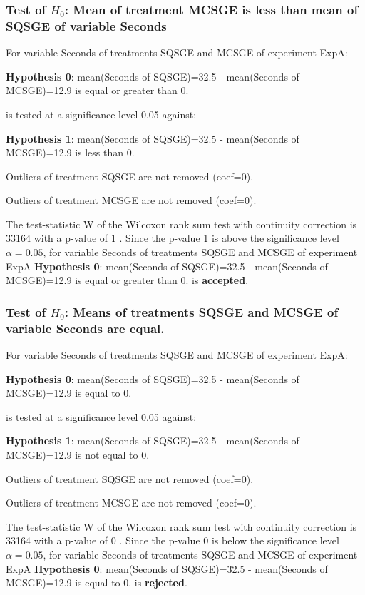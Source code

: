 \documentclass[18pt,c]{beamer}
\begin{document}
\begin{frame}[t]
 \frametitle{Test of $H_{0}$: Mean of treatment MCSGE is less than mean of SQSGE of variable Seconds }
 \scriptsize
 For variable Seconds of treatments SQSGE and MCSGE of experiment ExpA:

\vspace{1mm}
{\bf Hypothesis 0}: mean(Seconds of SQSGE)=32.5 - mean(Seconds of MCSGE)=12.9 is equal or greater than 0.


 \begin{center} is tested at a significance level 0.05 against: \end{center}

{\bf Hypothesis 1}: mean(Seconds of SQSGE)=32.5 - mean(Seconds of MCSGE)=12.9 is less than 0.
\vspace{1mm}
\vspace{1mm}

 Outliers of treatment SQSGE  are not removed (coef=0).

 Outliers of treatment MCSGE  are not removed (coef=0).
\vspace{1mm}
 
 The test-statistic W of the Wilcoxon rank sum test with continuity correction is 33164 with a p-value of 1 .
 Since the p-value 1 is above the significance level $\alpha= 0.05 $,
 for variable Seconds of treatments SQSGE and MCSGE of experiment ExpA 
 {\bf Hypothesis 0}: mean(Seconds of SQSGE)=32.5 - mean(Seconds of MCSGE)=12.9 is equal or greater than 0.
is {\bf accepted}.

 \end{frame}
\begin{frame}[t]
 \frametitle{Test of $H_{0}$: Means of treatments SQSGE and MCSGE of variable Seconds are equal. }
 \scriptsize
 For variable Seconds of treatments SQSGE and MCSGE of experiment ExpA:

\vspace{1mm}
{\bf Hypothesis 0}: mean(Seconds of SQSGE)=32.5 - mean(Seconds of MCSGE)=12.9 is equal to 0.


 \begin{center} is tested at a significance level 0.05 against: \end{center}

{\bf Hypothesis 1}: mean(Seconds of SQSGE)=32.5 - mean(Seconds of MCSGE)=12.9 is not equal to 0.
\vspace{1mm}
\vspace{1mm}

 Outliers of treatment SQSGE  are not removed (coef=0).

 Outliers of treatment MCSGE  are not removed (coef=0).
\vspace{1mm}
 
 The test-statistic W of the Wilcoxon rank sum test with continuity correction is 33164 with a p-value of 0 .
 Since the p-value 0 is below the significance level $\alpha= 0.05 $,
 for variable Seconds of treatments SQSGE and MCSGE of experiment ExpA 
 {\bf Hypothesis 0}: mean(Seconds of SQSGE)=32.5 - mean(Seconds of MCSGE)=12.9 is equal to 0.
is {\bf rejected}.

 \end{frame}
\end{document}
